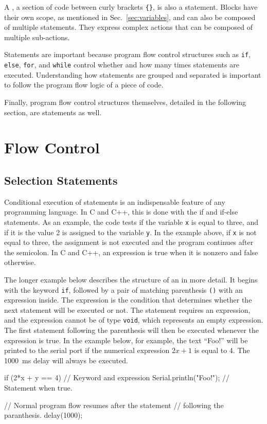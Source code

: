 A , a section of code between curly brackets \texttt{\{\}}, is also a statement.
Blocks have their own scope, as mentioned in Sec.~\ref{sec:variables}, and can also be composed of multiple statements.
They express complex actions that can be composed of multiple sub-actions.

Statements are important because program flow control structures such as \texttt{if}, \texttt{else}, \texttt{for}, and \texttt{while} control whether and how many times statements are executed.
Understanding how statements are grouped and separated is important to follow the program flow logic of a piece of code.

Finally, program flow control structures themselves, detailed in the following section, are statements as well.

\section{Flow Control}
\subsection{Selection Statements}
Conditional execution of statements is an indispensable feature of any programming language.
In C and C++, this is done with the if and if-else statements.
As an example, the code  tests if the variable \texttt{x} is equal to three, and if it is the value 2 is assigned to the variable \texttt{y}.
In the example above, if \texttt{x} is not equal to three, the assignment is not executed and the program continues after the semicolon.
In C and C++, an expression is true when it is nonzero and false otherwise.

The longer example below describes the structure of an  in more detail.
It begins with the keyword \texttt{if}, followed by a pair of matching parenthesis \texttt{()} with an expression inside.
The expression is the condition that determines whether the next statement will be executed or not.
The statement requires an expression, and the expression cannot be of type \texttt{void}, which represents an empty expression.
The first statement following the parenthesis will then be executed whenever the expression is true.
In the example below, for example, the text ``Foo!'' will be printed to the serial port if the numerical expression $2x + 1$ is equal to 4.
The \SI{1000}{ms} delay will always be executed.

\begin{inocode}
if (2*x + y == 4)        // Keyword and expression
  Serial.println("Foo!"); // Statement when true.

// Normal program flow resumes after the statement
// following the paranthesis.
delay(1000);
\end{inocode}

